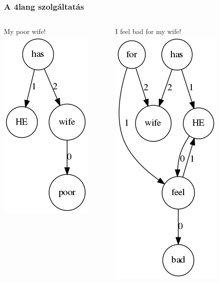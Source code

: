 \documentclass[bigger]{beamer}
\begin{document}
\begin{frame}
\frametitle{A 4lang szolgáltatás}
\begin{columns}
	\begin{column}{0.3\textwidth}
		\pause My poor wife!
		\pause \includegraphics[scale=0.4]{pics/wifepoor.png}
	\end{column}
	\begin{column}{0.4\textwidth}
		I feel bad for my wife!
		\pause \includegraphics[scale=0.4]{pics/feelbad.png}
	\end{column}
\end{columns}

\end{frame}
\end{document}
